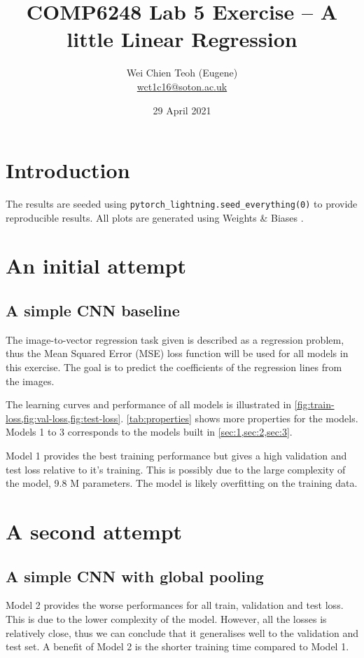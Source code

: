 \documentclass[twocolumn]{article}
\title{\Large COMP6248 Lab 5 Exercise -- A little Linear Regression}
\author{\small Wei Chien Teoh (Eugene)\\\bigskip \href{mailto:wct1c16@soton.ac.uk}{wct1c16@soton.ac.uk}}
\date{\small 29 April 2021}
\begin{document}
\maketitle

\section*{Introduction}

The results are seeded using \lstinline{pytorch_lightning.seed_everything(0)} to provide reproducible results. All plots are generated using Weights \& Biases \autocite{WeightsBiases}.

\section{An initial attempt} \label{sec:1}

\subsection{A simple CNN baseline}

The image-to-vector regression task given is described as a regression problem, thus the Mean Squared Error (MSE) loss function will be used for all models in this exercise. The goal is to predict the coefficients of the regression lines from the images.

The learning curves and performance of all models is illustrated in \cref{fig:train-loss,fig:val-loss,fig:test-loss}. \cref{tab:properties} shows more properties for the models. Models 1 to 3 corresponds to the models built in \cref{sec:1,sec:2,sec:3}.

Model 1 provides the best training performance but gives a high validation and test loss relative to it's training. This is possibly due to the large complexity of the model, 9.8 M parameters. The model is likely overfitting on the training data.


\section{A second attempt} \label{sec:2}

\subsection{A simple CNN with global pooling}

Model 2 provides the worse performances for all train, validation and test loss. This is due to the lower complexity of the model. However, all the losses is relatively close, thus we can conclude that it generalises well to the validation and test set. A benefit of Model 2 is the shorter training time compared to Model 1.
\end{document}
